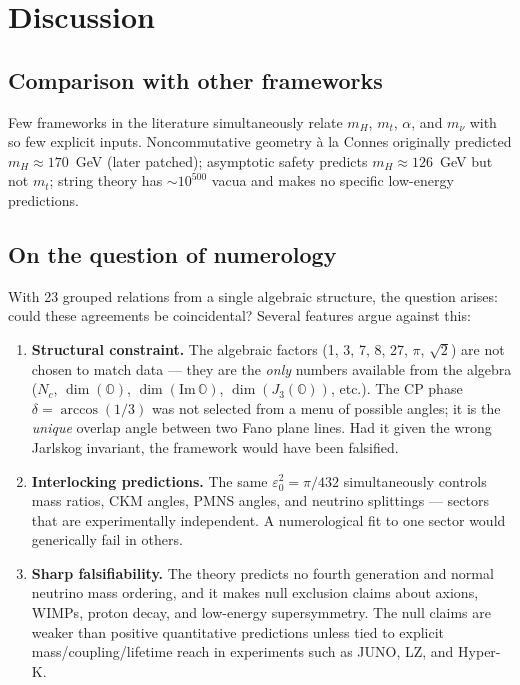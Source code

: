 \documentclass[12pt,a4paper]{article}
\theoremstyle{definition}
\theoremstyle{remark}
\newcommand{\Oct}{\mathbb{O}}
\begin{document}
\section{Discussion}
\label{sec:discussion}

\subsection{Comparison with other frameworks}

Few frameworks in the literature simultaneously relate $m_H$, $m_t$, 
$\alpha$, and $m_\nu$ with so few explicit inputs. Noncommutative geometry 
\`{a} la Connes originally predicted $m_H \approx 170$~GeV (later patched); 
asymptotic safety predicts $m_H\approx 126$~GeV but not $m_t$; string theory 
has $\sim 10^{500}$ vacua and makes no specific low-energy predictions.

\subsection{On the question of numerology}

With 23 grouped relations from a single algebraic structure, the question arises: 
could these agreements be coincidental? Several features argue against this:

\begin{enumerate}
\item \textbf{Structural constraint.} The algebraic factors (1, 3, 7, 8, 27, 
$\pi$, $\sqrt{2}$) are not chosen to match data --- they are the \emph{only} 
numbers available from the algebra ($N_c$, $\dim(\Oct)$, 
$\dim(\mathrm{Im}\,\Oct)$, $\dim(J_3(\Oct))$, etc.). The CP phase 
$\delta = \arccos(1/3)$ was not selected from a menu of possible angles; 
it is the \emph{unique} overlap angle between two Fano plane lines. Had it 
given the wrong Jarlskog invariant, the framework would have been falsified.

\item \textbf{Interlocking predictions.} The same $\varepsilon_0^2 = \pi/432$ 
simultaneously controls mass ratios, CKM angles, PMNS angles, and neutrino 
splittings --- sectors that are experimentally independent. A numerological 
fit to one sector would generically fail in others.

\item \textbf{Sharp falsifiability.} The theory predicts no fourth generation 
and normal neutrino mass ordering, and it makes null exclusion claims about 
axions, WIMPs, proton decay, and low-energy supersymmetry. The null claims are 
weaker than positive quantitative predictions unless tied to explicit 
mass/coupling/lifetime reach in experiments such as JUNO, LZ, and Hyper-K.
\end{enumerate}
\end{document}
